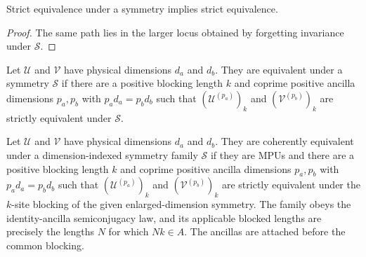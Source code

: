 \begin{lemma}
    \label{lem:mpu_strict_symmetry_equivalence_forget}
    \leanok
    Strict equivalence under a symmetry implies strict equivalence.
\end{lemma}

\begin{proof}\leanok
    The same path lies in the larger locus obtained by forgetting invariance
    under $\mathcal S$.
\end{proof}

\begin{definition}
    \label{def:equivalent-symmetry}
    \notready
    Let $\mathcal U$ and $\mathcal V$ have physical dimensions $d_a$ and
    $d_b$. They are equivalent under a symmetry $\mathcal S$ if there are a
    positive blocking length $k$ and coprime positive ancilla dimensions
    $p_a,p_b$ with $p_ad_a=p_bd_b$ such that $(\mathcal U^{(p_a)})_k$ and
    $(\mathcal V^{(p_b)})_k$ are strictly equivalent under $\mathcal S$.
\end{definition}

\begin{definition}
    \label{def:mpu_coherent_family_equivalent_symmetry}
    \leanok
    Let $\mathcal U$ and $\mathcal V$
    have physical dimensions $d_a$ and $d_b$. They are coherently equivalent
    under a dimension-indexed symmetry family $\mathcal S$ if they are MPUs and
    there are a positive blocking length $k$ and coprime positive ancilla
    dimensions $p_a,p_b$ with $p_ad_a=p_bd_b$ such that
    $(\mathcal U^{(p_a)})_k$ and
    $(\mathcal V^{(p_b)})_k$ are strictly equivalent under the $k$-site
    blocking of the given enlarged-dimension symmetry. The family obeys the
    identity-ancilla semiconjugacy law, and its applicable blocked lengths are
    precisely the lengths $N$ for which $Nk\in A$. The ancillas are attached
    before the common blocking.
\end{definition}

